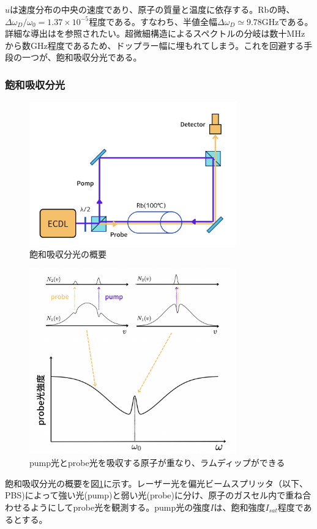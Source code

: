 \documentclass[dvipdfmx]{jsarticle}
\begin{document}
$u$は速度分布の中央の速度であり、原子の質量と温度に依存する。Rbの時、$\Delta\omega_D/\omega_0 = 1.37\times10^{-5}$程度である。すなわち、半値全幅$\Delta\omega_D\simeq\text{9.78GHz}$である。詳細な導出は\cite{foot}を参照されたい。超微細構造によるスペクトルの分岐は数十MHzから数GHz程度であるため、ドップラー幅に埋もれてしまう。これを回避する手段の一つが、飽和吸収分光である。

\subsubsection{飽和吸収分光}
\begin{figure}
\centering
\includegraphics[width=0.8\textwidth]{images/sas.png}
\caption{\label{fig:sas}飽和吸収分光の概要}
\end{figure}
\begin{figure}
\centering
\includegraphics[width=0.8\textwidth]{images/sas_graph.png}
\caption{\label{fig:sas-graph}pump光とprobe光を吸収する原子が重なり、ラムディップができる}
\end{figure}
飽和吸収分光の概要を図\ref{fig:sas}に示す。レーザー光を偏光ビームスプリッタ（以下、PBS)によって強い光(pump)と弱い光(probe)に分け、原子のガスセル内で重ね合わせるようにしてprobe光を観測する。pump光の強度$I$は、飽和強度$I_{sat}$程度であるとする。
\end{document}
